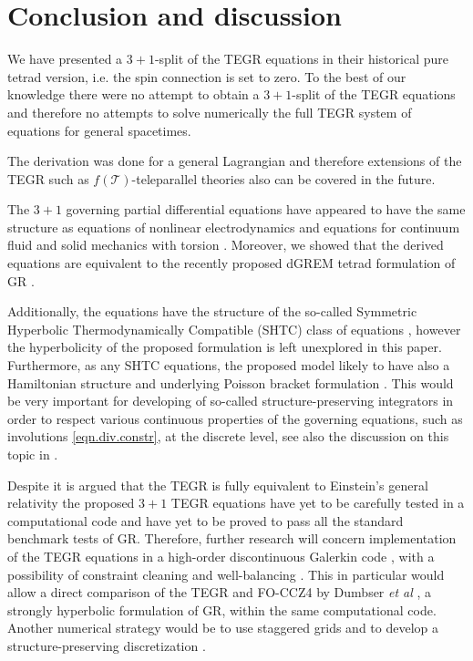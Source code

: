 \documentclass[
10pt, %
a4paper, %
oneside, %
headinclude,footinclude, %
BCOR5mm, %
]{scrartcl}
\newcommand{\Tscal}{\mathcal{T}}		%
\begin{document}
\section{Conclusion and discussion}

We have presented a $ 3+1 $-split of the TEGR equations in their historical pure tetrad version, 
i.e. the spin connection is set to zero. To the best of our knowledge there were no attempt to 
obtain a $ 3+1 $-split of the TEGR equations and therefore no attempts to solve numerically the 
full TEGR system of equations for general spacetimes. 

The derivation was done for a general Lagrangian and therefore extensions of the TEGR such as $ 
f(\Tscal) $-teleparallel theories also can be covered in the future. 

The $ 3+1 $ governing partial differential equations have appeared to have the same structure as 
equations of nonlinear electrodynamics \cite{DPRZ2017} and equations for continuum fluid and solid 
mechanics with torsion \cite{Torsion2019}. Moreover, we showed that the derived equations are 
equivalent to the recently proposed dGREM tetrad formulation of GR \cite{Olivares2022}. 

Additionally, the equations have the structure of the so-called Symmetric Hyperbolic 
Thermodynamically 
Compatible (SHTC) class of equations \cite{God1961,SHTC-GENERIC-CMAT}, however the hyperbolicity of 
the proposed formulation is left unexplored in this paper. Furthermore, as any SHTC equations, the 
proposed model likely to have also a Hamiltonian structure and underlying Poisson bracket 
formulation \cite{SHTC-GENERIC-CMAT,PKG_Book2018}. This would be very important for developing of 
so-called structure-preserving integrators \cite{HTC2022} in order to respect various continuous 
properties of the 
governing equations, such as involutions \eqref{eqn.div.constr}, at the discrete level, see also the 
discussion on this topic in \cite{Olivares2022}.

Despite it is argued that the TEGR is fully equivalent to Einstein's general relativity the 
proposed $ 3+1 $ TEGR equations have yet to be carefully tested in a computational code and have 
yet to be proved to pass all the standard benchmark tests of GR. Therefore, further research will 
concern implementation of the TEGR equations in a high-order discontinuous Galerkin code 
\cite{Dumbser2018a,Busto2020}, with a possibility of constraint cleaning  \cite{Dumbser2019} and 
well-balancing 
\cite{Gaburro2021}. This in particular would allow a direct comparison of the TEGR and FO-CCZ4 by 
Dumbser \textit{et al} \cite{FO-CCZ4}, a
strongly hyperbolic formulation of GR, within the same computational code.  Another 
numerical 
strategy would be to use staggered grids and to develop a
structure-preserving discretization \cite{SIGPR2021,Olivares2022,Fambri2020a}. 
\end{document}
